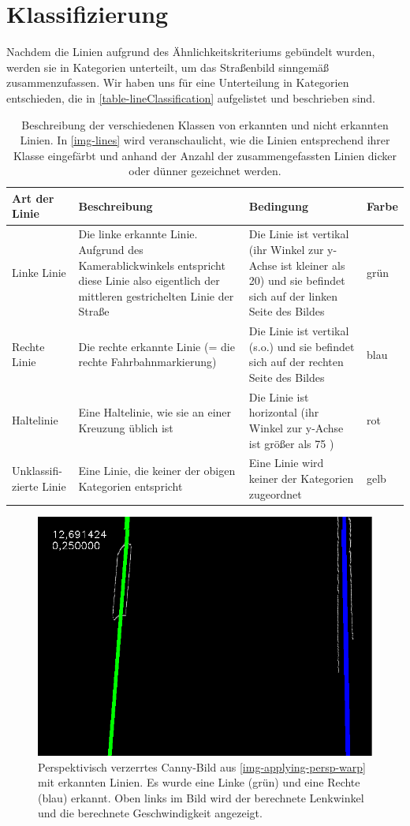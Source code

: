 \documentclass[a4paper,12pt]{report}
\begin{document}
\section{Klassifizierung}
	Nachdem die Linien aufgrund des Ähnlichkeitskriteriums gebündelt wurden, werden sie in Kategorien unterteilt, um das Straßenbild sinngemäß zusammenzufassen.
	Wir haben uns für eine Unterteilung in Kategorien entschieden, die in \autoref{table-lineClassification} aufgelistet und beschrieben sind. %
	\begin{table}
		\begin{tabular}{p{}|p{}|p{}|p{}}
			Art der Linie & Beschreibung & Bedingung & Farbe\\\hline
			Linke Linie &  Die linke erkannte Linie. Aufgrund des Kamerablickwinkels entspricht diese Linie also eigentlich der mittleren gestrichelten Linie der Straße & Die Linie ist vertikal (ihr Winkel zur y-Achse ist kleiner als 20\degree) und sie befindet sich auf der linken Seite des Bildes & grün\\\hline
			Rechte Linie & Die rechte erkannte Linie (= die rechte Fahrbahnmarkierung) & Die Linie ist vertikal (s.o.) und sie befindet sich auf der rechten Seite des Bildes & blau\\\hline
			Haltelinie & Eine Haltelinie, wie sie an einer Kreuzung üblich ist & Die Linie ist horizontal (ihr Winkel zur y-Achse ist größer als 75 \degree) & rot\\\hline
			Unklassifi-zierte Linie & Eine Linie, die keiner der obigen Kategorien entspricht & Eine Linie wird keiner der Kategorien zugeordnet  & gelb\\
		\end{tabular}
		\caption{Beschreibung der verschiedenen Klassen von erkannten und nicht erkannten Linien.
		In \autoref{img-lines} wird veranschaulicht, wie die Linien entsprechend ihrer Klasse eingefärbt und anhand der Anzahl der zusammengefassten Linien dicker oder dünner gezeichnet werden.}
		\label{table-lineClassification}
	\end{table}

	\begin{figure}
		\centering
		\includegraphics[width=.5\textwidth]{assets/Strasse-Final}
		\caption{Perspektivisch verzerrtes Canny-Bild aus \autoref{img-applying-persp-warp} mit erkannten Linien.
			Es wurde eine Linke (grün) und eine Rechte (blau) erkannt. Oben links im Bild wird der berechnete Lenkwinkel und die berechnete Geschwindigkeit angezeigt.}
		\label{img-lines}
	\end{figure}
\end{document}
